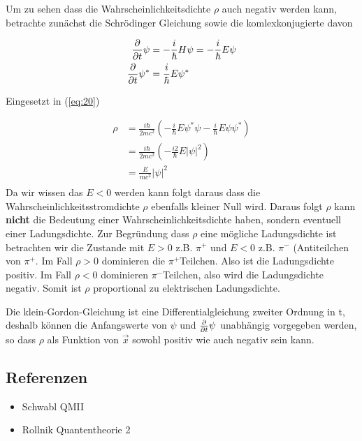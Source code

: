 Um zu sehen dass die Wahrscheinlichkeitsdichte \(\rho\) auch negativ werden kann, betrachte zunächst die Schrödinger Gleichung sowie die komlexkonjugierte davon

\begin{align}
  \label{eq:22}
  \pdiff_t \psi &= - \frac{i}{\hbar} H\psi = -  \frac{i}{\hbar} E\psi\\
\pdiff_t \psi^* &= \frac{i}{\hbar} E\psi^*
\end{align}


Eingesetzt in (\ref{eq:20})

\begin{align}
  \label{eq:23}
   \rho &=  \frac{i\hbar}{2mc^2}\left( - \frac{i}{\hbar} E \psi^*\psi   -\frac{i}{\hbar} E  \psi\psi^*   \right) \\
&= \frac{i\hbar}{2mc^2}\left( - \frac{i2}{\hbar} E |\psi|^2   \right)  \\
&= \frac{E}{mc^2}|\psi|^2    \\
\end{align}
Da wir wissen das \(E<0\) werden kann folgt daraus dass die Wahrscheinlichkeitsstromdichte \(\rho\) ebenfalls kleiner Null wird. Daraus folgt \(\rho\) kann \textbf{nicht} die Bedeutung einer Wahrscheinlichkeitsdichte haben, sondern eventuell einer Ladungsdichte. Zur Begründung dass \(\rho\) eine mögliche Ladungsdichte ist betrachten wir die Zustande mit \(E>0\) z.B. \(\pi^+\) und \(E<0\) z.B. \(\pi^-\) (Antiteilchen von \(\pi^+\). Im Fall \(\rho>0\) dominieren die \(\pi^+\)Teilchen. Also ist die Ladungsdichte positiv. Im Fall \(\rho<0\) dominieren \(\pi^-\)Teilchen, also wird die Ladungsdichte negativ. Somit ist \(\rho\) proportional zu elektrischen Ladungsdichte.

Die klein-Gordon-Gleichung ist eine Differentialgleichung zweiter Ordnung in t, deshalb können die Anfangswerte von \(\psi\) und \(\pdiff_t\psi\) unabhängig vorgegeben werden, so dass \(\rho\) als Funktion von \(\vec x\) sowohl positiv wie auch negativ sein kann. 




\subsection*{Referenzen}
\begin{itemize}
\item Schwabl QMII
\item Rollnik Quantentheorie 2
\end{itemize}


